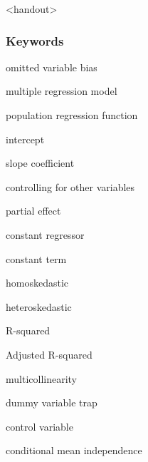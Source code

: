 

\begin{frame}<handout>
\frametitle{Keywords}
\begin{iteminline}
\item omitted variable bias
\item multiple regression model
\item population regression function
\item intercept
\item slope coefficient
\item controlling for other variables
\item partial effect
\item constant regressor
\item constant term
\item homoskedastic
\item heteroskedastic 
\item R-squared
\item Adjusted R-squared
\item multicollinearity
\item dummy variable trap
\item control variable
\item conditional mean independence
\end{iteminline}
\end{frame}


